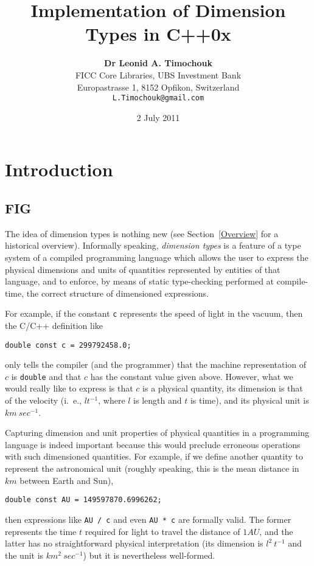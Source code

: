 \documentclass[11pt,a4paper]{article}
\title{\textbf{Implementation of Dimension Types in C++0x}}
\author{\textbf{Dr Leonid A. Timochouk} \\[3mm]
				FICC Core Libraries, UBS Investment Bank   \\
				Europastrasse 1, 8152 Opfikon, Switzerland \\[3mm]
				\texttt{L.Timochouk@gmail.com}}
\date{2 July 2011}
\begin{document}
\maketitle

\section{Introduction}
\label{Intro}

\subsection{FIG}

The idea of dimension types is nothing new (see Section~\ref{Overview} for a
historical overview). Informally speaking, \textit{dimension types} is a
feature of a type system of a compiled programming language which allows the
user to express the physical dimensions and units of quantities
represented by entities of that language, and to enforce, by means of static
type-checking performed at compile-time, the correct structure of dimensioned
expressions.

For example, if the constant \texttt{c} represents the speed of light in the
vacuum, then the C/C++ definition like
\begin{verbatim}
double const c = 299792458.0;
\end{verbatim}
only tells the compiler (and the programmer) that the machine representation
of $c$ is \texttt{double} and that $c$ has the constant value given above.
However, what we would really like to express is that $c$ is a physical
quantity, its dimension is that of the velocity (i.~e., $ l t^{-1} $,
where $l$ is length and $t$ is time), and its physical unit is
$ km\ sec^{-1} $.

Capturing dimension and unit properties of physical quantities in a programming
language is indeed important because this would preclude erroneous operations
with such dimensioned quantities. For example, if we define another quantity to
represent the astronomical unit (roughly speaking, this is the mean distance in
$km$ between Earth and Sun),
\begin{verbatim}
double const AU = 149597870.6996262;
\end{verbatim}
then expressions like \texttt{AU / c} and even \texttt{AU * c} are formally
valid. The former represents the time $t$ required for light to travel the
distance of $ 1 AU $, and the latter has no straightforward physical
interpretation (its dimension is $ l^2\ t^{-1} $ and the unit is
$ km^2\ sec^{-1} $) but it is nevertheless well-formed.
\end{document}

